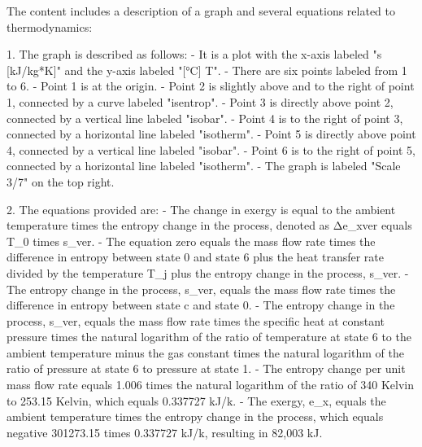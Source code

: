 The content includes a description of a graph and several equations related to thermodynamics:

1. The graph is described as follows:
   - It is a plot with the x-axis labeled "s [kJ/kg*K]" and the y-axis labeled "[°C] T".
   - There are six points labeled from 1 to 6.
   - Point 1 is at the origin.
   - Point 2 is slightly above and to the right of point 1, connected by a curve labeled "isentrop".
   - Point 3 is directly above point 2, connected by a vertical line labeled "isobar".
   - Point 4 is to the right of point 3, connected by a horizontal line labeled "isotherm".
   - Point 5 is directly above point 4, connected by a vertical line labeled "isobar".
   - Point 6 is to the right of point 5, connected by a horizontal line labeled "isotherm".
   - The graph is labeled "Scale 3/7" on the top right.

2. The equations provided are:
   - The change in exergy is equal to the ambient temperature times the entropy change in the process, denoted as Δe_xver equals T_0 times s_ver.
   - The equation zero equals the mass flow rate times the difference in entropy between state 0 and state 6 plus the heat transfer rate divided by the temperature T_j plus the entropy change in the process, s_ver.
   - The entropy change in the process, s_ver, equals the mass flow rate times the difference in entropy between state c and state 0.
   - The entropy change in the process, s_ver, equals the mass flow rate times the specific heat at constant pressure times the natural logarithm of the ratio of temperature at state 6 to the ambient temperature minus the gas constant times the natural logarithm of the ratio of pressure at state 6 to pressure at state 1.
   - The entropy change per unit mass flow rate equals 1.006 times the natural logarithm of the ratio of 340 Kelvin to 253.15 Kelvin, which equals 0.337727 kJ/k.
   - The exergy, e_x, equals the ambient temperature times the entropy change in the process, which equals negative 301273.15 times 0.337727 kJ/k, resulting in 82,003 kJ.